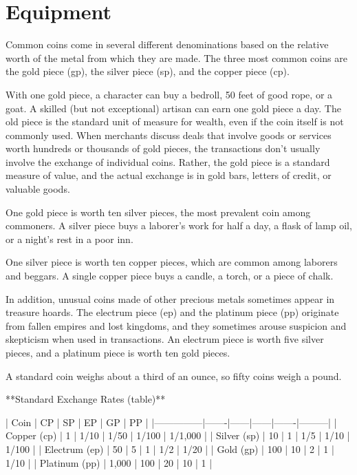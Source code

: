 \chapter{Equipment}
\label{ch:equipment}

Common coins come in several different denominations based on the relative worth of the metal from which they are made. The three most common coins are the gold piece (gp), the silver piece (sp), and the copper piece (cp).

With one gold piece, a character can buy a bedroll, 50 feet of good rope, or a goat. A skilled (but not exceptional) artisan can earn one gold piece a day. The old piece is the standard unit of measure for wealth, even if the coin itself is not commonly used. When merchants discuss deals that involve goods or services worth hundreds or thousands of gold pieces, the transactions don't usually involve the exchange of individual coins. Rather, the gold piece is a standard measure of value, and the actual exchange is in gold bars, letters of credit, or valuable goods.

One gold piece is worth ten silver pieces, the most prevalent coin among commoners. A silver piece buys a laborer's work for half a day, a flask of lamp oil, or a night's rest in a poor inn.

One silver piece is worth ten copper pieces, which are common among laborers and beggars. A single copper piece buys a candle, a torch, or a piece of chalk.

In addition, unusual coins made of other precious metals sometimes appear in treasure hoards. The electrum piece (ep) and the platinum piece (pp) originate from fallen empires and lost kingdoms, and they sometimes arouse suspicion and skepticism when used in transactions. An electrum piece is worth five silver pieces, and a platinum piece is worth ten gold pieces.

A standard coin weighs about a third of an ounce, so fifty coins weigh a pound.

**Standard Exchange Rates (table)**

| Coin          | CP    | SP   | EP   | GP    | PP      |
|---------------|-------|------|------|-------|---------|
| Copper (cp)   | 1     | 1/10 | 1/50 | 1/100 | 1/1,000 |
| Silver (sp)   | 10    | 1    | 1/5  | 1/10  | 1/100   |
| Electrum (ep) | 50    | 5    | 1    | 1/2   | 1/20    |
| Gold (gp)     | 100   | 10   | 2    | 1     | 1/10    |
| Platinum (pp) | 1,000 | 100  | 20   | 10    | 1       |

